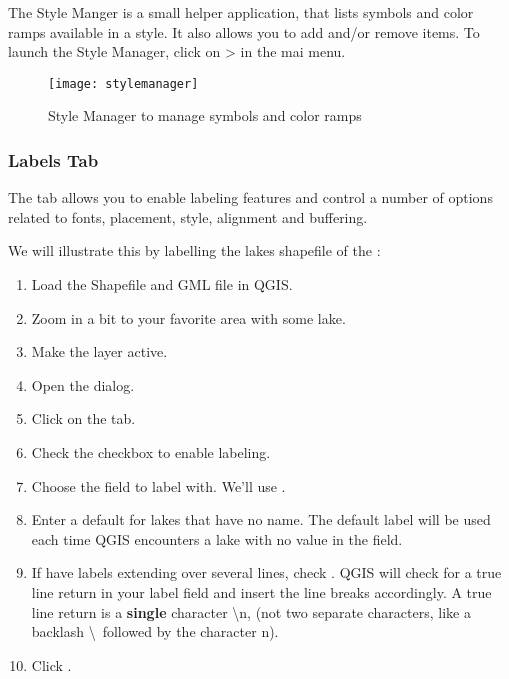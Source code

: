 The Style Manger is a small helper application, that lists symbols and color 
ramps available in a style. It also allows you to add and/or remove items. To 
launch the Style Manager, click on  >  in the mai menu.

\begin{figure}[ht]
   \begin{center}
   \caption{Style Manager to manage symbols and color ramps \nixcaption}\label{fig:stylemanager}\smallskip
   \texttt{[image: stylemanager]}
\end{center}
\end{figure}

\subsubsection{Labels Tab}

The  tab allows you to enable labeling features and control a number of
options related to fonts, placement, style, alignment and buffering.

We will illustrate this by labelling the lakes shapefile of the
:

\begin{enumerate}
\item Load the Shapefile  and GML file  in QGIS.
\item Zoom in a bit to your favorite area with some lake.
\item Make the  layer active.
\item Open the  dialog.
\item Click on the  tab.
\item Check the  checkbox to enable labeling.
\item Choose the field to label with. 
  We'll use .
\item Enter a default for lakes that have no name. The default label will be
  used each time QGIS encounters a lake with no value in the 
field.
\item If have labels extending over several lines, check . QGIS will check for a true line return in your label field and
insert the line breaks accordingly. A true line return is a \textbf{single}
character \textbackslash n, (not two separate characters, like a backlash
\textbackslash ~followed by the character n).
\item Click .
\end{enumerate} 

